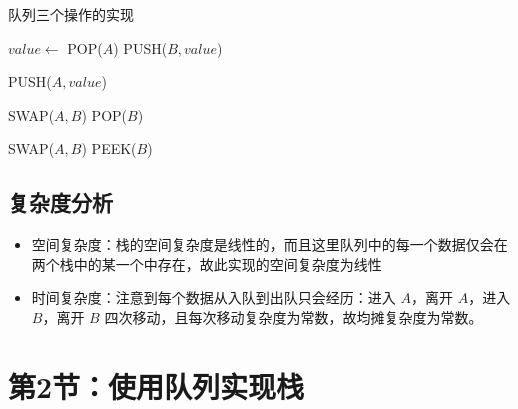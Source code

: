 \documentclass{tufte-handout}
\begin{document}
\begin{CJK*}{UTF8}{gbsn}
\begin{algorithm}[t]
\caption{队列三个操作的实现}
\begin{algorithmic}[1]
    \State $value \gets$ POP($A$)
    \State PUSH($B,value$)
    \EndWhile
    \hStatex
    \EndProcedure

    \State PUSH($A,value$)
    \hStatex
    \EndProcedure

    \State SWAP($A,B$)
    \EndIf
    \Return POP($B$)
    \hStatex
    \EndProcedure

    \State SWAP($A,B$)
    \EndIf
    \Return PEEK($B$)
    \hStatex
    \EndProcedure
\end{algorithmic}
\end{algorithm}

\subsection{复杂度分析}
\begin{itemize}
    \item 空间复杂度：栈的空间复杂度是线性的，而且这里队列中的每一个数据仅会在两个栈中的某一个中存在，故此实现的空间复杂度为线性
    \item 时间复杂度：注意到每个数据从入队到出队只会经历：进入 $A$，离开 $A$，进入 $B$，离开 $B$ 四次移动，且每次移动复杂度为常数，故均摊复杂度为常数。
\end{itemize}

\newpage
\section{第2节：使用队列实现栈}

\end{CJK*}
\end{document}
